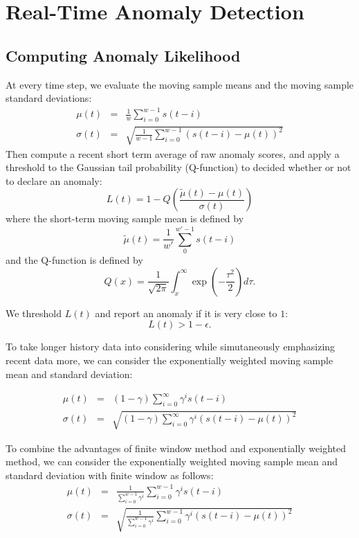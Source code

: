 \section{Real-Time Anomaly Detection}

\subsection{Computing Anomaly Likelihood}

At every time step, we evaluate the moving sample means and the moving sample standard deviations:
\begin{eqnarray}
\mu(t) &=& \frac{1}{w} \sum_{i=0}^{w-1} s(t-i)
\\
\sigma(t) &=& \sqrt{\frac{1}{w-1} \sum_{i=0}^{w-1} (s(t-i)-\mu(t))^2}
\end{eqnarray}
Then compute a recent short term average of raw anomaly scores,
and apply a threshold to the Gaussian tail probability (Q-function)
to decided whether or not to declare an anomaly:
\begin{equation}
L(t) = 1 - Q\left(\frac{\tilde{\mu}(t) - \mu(t)}{\sigma(t)}\right)
\end{equation}
where the short-term moving sample mean is defined by
\begin{equation}
\tilde{\mu}(t) = \frac{1}{w'} \sum_{0}^{w'-1} s(t-i)
\end{equation}
and the Q-function is defined by
\begin{equation}
Q(x) = \frac{1}{\sqrt{2\pi}} \int_x^\infty \exp\left(-\frac{\tau^2}{2}\right)  d \tau.
\end{equation}

We threshold $L(t)$ and report an anomaly if it is very close to $1$:
\begin{equation}
L(t) > 1 - \epsilon.
\end{equation}



To take longer history data into considering while simutaneously emphasizing recent data more,
we can consider the exponentially weighted moving sample mean and standard deviation:

\begin{eqnarray}
\mu(t) &=& (1-\gamma) \sum_{i=0}^{\infty} \gamma^i s(t-i)
\\
\sigma(t) &=& \sqrt{(1-\gamma) \sum_{i=0}^{\infty} \gamma^i (s(t-i)-\mu(t))^2}
\end{eqnarray}

To combine the advantages of finite window method and exponentially weighted method,
we can consider the exponentially weighted moving sample mean and standard deviation with finite window
as follows:
\begin{eqnarray}
\mu(t) &=& \frac{1}{\sum_{i=0}^{w-1} \gamma^i }\sum_{i=0}^{w-1} \gamma^i s(t-i)
\\
\sigma(t) &=& \sqrt{\frac{1}{\sum_{i=0}^{w-1} \gamma^i }\sum_{i=0}^{w-1} \gamma^i (s(t-i)-\mu(t))^2}
\end{eqnarray}
